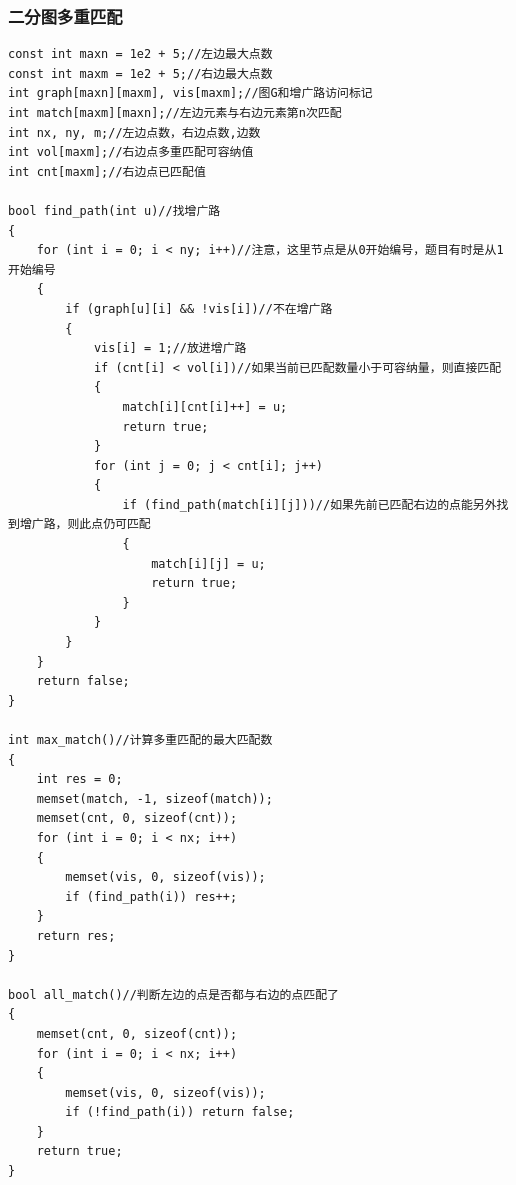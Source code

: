 \documentclass[twoside]{article}
\begin{document}
\subsubsection{二分图多重匹配}
\begin{lstlisting}
const int maxn = 1e2 + 5;//左边最大点数
const int maxm = 1e2 + 5;//右边最大点数
int graph[maxn][maxm], vis[maxm];//图G和增广路访问标记
int match[maxm][maxn];//左边元素与右边元素第n次匹配
int nx, ny, m;//左边点数，右边点数,边数
int vol[maxm];//右边点多重匹配可容纳值
int cnt[maxm];//右边点已匹配值

bool find_path(int u)//找增广路
{
    for (int i = 0; i < ny; i++)//注意，这里节点是从0开始编号，题目有时是从1开始编号
    {
        if (graph[u][i] && !vis[i])//不在增广路
        {
            vis[i] = 1;//放进增广路
            if (cnt[i] < vol[i])//如果当前已匹配数量小于可容纳量，则直接匹配
            {
                match[i][cnt[i]++] = u;
                return true;
            }
            for (int j = 0; j < cnt[i]; j++)
            {
                if (find_path(match[i][j]))//如果先前已匹配右边的点能另外找到增广路，则此点仍可匹配
                {
                    match[i][j] = u;
                    return true;
                }
            }
        }
    }
    return false;
}

int max_match()//计算多重匹配的最大匹配数
{
    int res = 0;
    memset(match, -1, sizeof(match));
    memset(cnt, 0, sizeof(cnt));
    for (int i = 0; i < nx; i++)
    {
        memset(vis, 0, sizeof(vis));
        if (find_path(i)) res++;
    }
    return res;
}

bool all_match()//判断左边的点是否都与右边的点匹配了
{
    memset(cnt, 0, sizeof(cnt));
    for (int i = 0; i < nx; i++)
    {
        memset(vis, 0, sizeof(vis));
        if (!find_path(i)) return false;
    }
    return true;
}\end{lstlisting}
\end{document}
